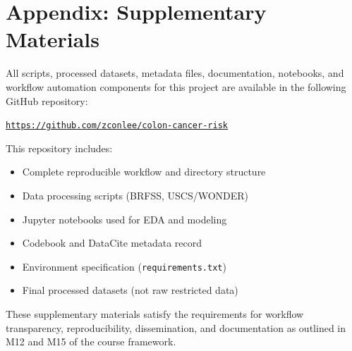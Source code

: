 \documentclass[12pt]{article}
\begin{document}
\section*{Appendix: Supplementary Materials}

All scripts, processed datasets, metadata files, documentation, notebooks, and workflow automation components for this project are available in the following GitHub repository:

\begin{center}
\href{https://github.com/zconlee/colon-cancer-risk}{\texttt{https://github.com/zconlee/colon-cancer-risk}}
\end{center}

This repository includes:
\begin{itemize}
    \item Complete reproducible workflow and directory structure
    \item Data processing scripts (BRFSS, USCS/WONDER)
    \item Jupyter notebooks used for EDA and modeling
    \item Codebook and DataCite metadata record
    \item Environment specification (\texttt{requirements.txt})
    \item Final processed datasets (not raw restricted data)
\end{itemize}

These supplementary materials satisfy the requirements for workflow transparency, reproducibility, dissemination, and documentation as outlined in M12 and M15 of the course framework.
\end{document}
